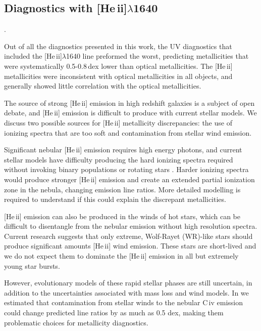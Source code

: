 \documentclass[preprint2]{aastex62}
\newcommand{\heii}{[He\,{\sc ii}]\xspace}
\newcommand{\civ}{C\,{\sc iv}\xspace}
\begin{document}
\subsection{Diagnostics with \heii$\lambda$1640}.

Out of all the diagnostics presented in this work, the UV diagnostics that included the \heii$\lambda$1640 line preformed the worst, predicting metallicities that were systematically 0.5-0.8\,dex lower than optical metallicities. The \heii metallicities were inconsistent with optical metallicities in all objects, and generally showed little correlation with the optical metallicities.

The source of strong \heii emission in high redshift galaxies is a subject of open debate, and \heii emission is difficult to produce with current stellar models. We discuss two possible sources for \heii metallicity discrepancies: the use of ionizing spectra that are too soft and contamination from stellar wind emission.

Significant nebular \heii emission requires high energy photons, and current stellar models have difficulty producing the hard ionizing spectra required without invoking binary populations or rotating stars \citep[e.g.,][]{Stark+2014, Steidel+2016, Byler+2017}. Harder ionizing spectra would produce stronger \heii emission and create an extended partial ionization zone in the nebula, changing emission line ratios. More detailed modelling is required to understand if this could explain the discrepant metallicities.

\heii emission can also be produced in the winds of hot stars, which can be difficult to disentangle from the nebular emission without high resolution spectra. Current research suggests that only extreme, Wolf-Rayet (WR)-like stars should produce significant amounts \heii wind emission. These stars are short-lived and we do not expect them to dominate the \heii emission in all but extremely young star bursts.

However, evolutionary models of these rapid stellar phases are still uncertain, in addition to the uncertainties associated with mass loss and wind models. In \citet{Byler+2018} we estimated that contamination from stellar winds to the nebular \civ emission could change predicted line ratios by as much as 0.5 dex, making them problematic choices for metallicity diagnostics.


\end{document}
